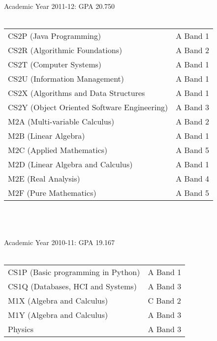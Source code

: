 \documentclass[10pt,a4paper]{article}
\begin{document}
\\\\\\
Academic Year 2011-12: GPA 20.750\\\\
\begin{tabular}{p{10cm}l}
	CS2P (Java Programming) & A Band 1\\
	CS2R (Algorithmic Foundations) & A Band 2\\
	CS2T (Computer Systems) & A Band 1\\
	CS2U (Information Management) & A Band 1\\
	CS2X (Algorithms and Data Structures & A Band 1\\
	CS2Y (Object Oriented Software Engineering) & A Band 3\\
	M2A (Multi-variable Calculus) & A Band 2\\
	M2B (Linear Algebra) & A Band 1\\
	M2C (Applied Mathematics) & A Band 5\\
	M2D (Linear Algebra and Calculus) & A Band 1\\
	M2E (Real Analysis) & A Band 4\\
	M2F (Pure Mathematics) & A Band 5\\
\end{tabular}
\\\\\\
Academic Year 2010-11: GPA 19.167\\\\
\begin{tabular}{p{10cm}l}
	CS1P (Basic programming in Python) & A Band 1\\
	CS1Q (Databases, HCI and Systems) & A Band 3\\
	M1X (Algebra and Calculus) & C Band 2\\
	M1Y (Algebra and Calculus) & A Band 3\\
	Physics & A Band 3\\
\end{tabular}
\end{document}

